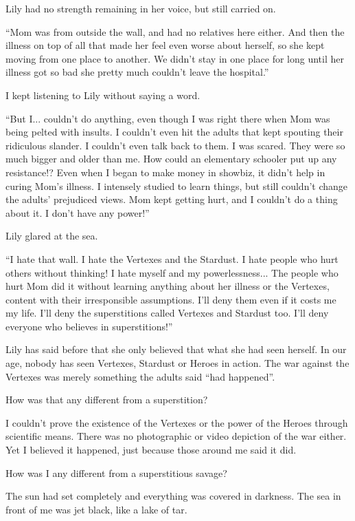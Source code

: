 Lily had no strength remaining in her voice, but still carried on.

``Mom was from outside the wall, and had no relatives here either. And then the illness on top of all that made her feel even worse about herself, so she kept moving from one place to another. We didn't stay in one place for long until her illness got so bad she pretty much couldn't leave the hospital.''

I kept listening to Lily without saying a word.

``But I... couldn't do anything, even though I was right there when Mom was being pelted with insults. I couldn't even hit the adults that kept spouting their ridiculous slander.
I couldn't even talk back to them. I was scared. They were so much bigger and older than me. How could an elementary schooler put up any resistance!? Even when I began to make money in showbiz, it didn't help in curing Mom's illness. I intensely studied to learn things, but still couldn't change the adults' prejudiced views. Mom kept getting hurt, and I couldn't do a thing about it. I don't have any power!''

Lily glared at the sea.

``I hate that wall. I hate the Vertexes and the Stardust. I hate people who hurt others without thinking! I hate myself and my powerlessness... The people who hurt Mom did it without learning anything about her illness or the Vertexes, content with their irresponsible assumptions. I'll deny them even if it costs me my life. I'll deny the superstitions called Vertexes and Stardust too. I'll deny everyone who believes in superstitions!''

Lily has said before that she only believed that what she had seen herself. In our age, nobody has seen Vertexes, Stardust or Heroes in action. The war against the Vertexes was merely something the adults said ``had happened''.

How was that any different from a superstition?

I couldn't prove the existence of the Vertexes or the power of the Heroes through scientific means. There was no photographic or video depiction of the war either. Yet I believed it happened, just because those around me said it did.

How was I any different from a superstitious savage?

The sun had set completely and everything was covered in darkness. The sea in front of me was jet black, like a lake of tar.

